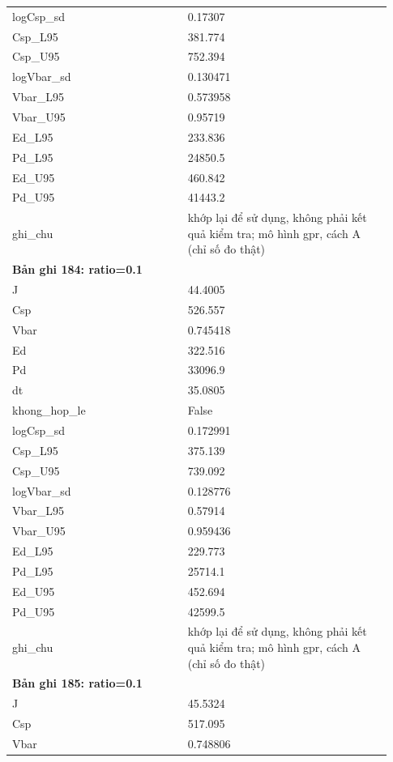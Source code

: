 \begin{longtable}{p{0.43\linewidth}p{0.50\linewidth}}
logCsp\_\allowbreak sd & 0.17307 \\
Csp\_\allowbreak L95 & 381.774 \\
Csp\_\allowbreak U95 & 752.394 \\
logVbar\_\allowbreak sd & 0.130471 \\
Vbar\_\allowbreak L95 & 0.573958 \\
Vbar\_\allowbreak U95 & 0.95719 \\
Ed\_\allowbreak L95 & 233.836 \\
Pd\_\allowbreak L95 & 24850.5 \\
Ed\_\allowbreak U95 & 460.842 \\
Pd\_\allowbreak U95 & 41443.2 \\
ghi\_\allowbreak chu & khớp lại để sử dụng, không phải kết quả kiểm tra; mô hình gpr, cách A (chỉ số đo thật) \\
\midrule
\multicolumn{2}{p{0.95\linewidth}}{\textbf{Bản ghi 184: ratio=0.1}} \\
J & 44.4005 \\
Csp & 526.557 \\
Vbar & 0.745418 \\
Ed & 322.516 \\
Pd & 33096.9 \\
dt & 35.0805 \\
khong\_\allowbreak hop\_\allowbreak le & False \\
logCsp\_\allowbreak sd & 0.172991 \\
Csp\_\allowbreak L95 & 375.139 \\
Csp\_\allowbreak U95 & 739.092 \\
logVbar\_\allowbreak sd & 0.128776 \\
Vbar\_\allowbreak L95 & 0.57914 \\
Vbar\_\allowbreak U95 & 0.959436 \\
Ed\_\allowbreak L95 & 229.773 \\
Pd\_\allowbreak L95 & 25714.1 \\
Ed\_\allowbreak U95 & 452.694 \\
Pd\_\allowbreak U95 & 42599.5 \\
ghi\_\allowbreak chu & khớp lại để sử dụng, không phải kết quả kiểm tra; mô hình gpr, cách A (chỉ số đo thật) \\
\midrule
\multicolumn{2}{p{0.95\linewidth}}{\textbf{Bản ghi 185: ratio=0.1}} \\
J & 45.5324 \\
Csp & 517.095 \\
Vbar & 0.748806 \\

\end{longtable}
